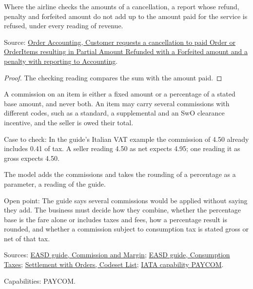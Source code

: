 \begin{theorem}
  \label{thm:accounting-cancel-adds-up}
  Where the airline checks the amounts of a cancellation, a report whose
  refund, penalty and forfeited amount do not add up to the amount paid for
  the service is refused, under every reading of revenue.

  Source: \href{https://standards.atlassian.net/wiki/spaces/OA/pages/844333143}{Order Accounting, Customer requests a cancellation to paid Order or OrderItems resulting in Partial Amount Refunded with a Forfeited amount and a penalty with reporting to Accounting}.
\end{theorem}
\begin{proof}
  The checking reading compares the sum with the amount paid.
\end{proof}

\begin{definition}
  \label{def:accounting-commission-structure}
  A commission on an item is either a fixed amount or a percentage of a
  stated base amount, and never both. An item may carry several commissions
  with different codes, such as a standard, a supplemental and an SwO
  clearance incentive, and the seller is owed their total.

  Case to check: In the guide's Italian VAT example the commission of 4.50
  already includes 0.41 of tax. A seller reading 4.50 as net expects 4.95;
  one reading it as gross expects 4.50.

  The model adds the commissions and takes the rounding of a percentage as
  a parameter, a reading of the guide.

  Open point: The guide says several commissions would be applied without
  saying they add. The business must decide how they combine, whether the
  percentage base is the fare alone or includes taxes and fees, how a
  percentage result is rounded, and whether a commission subject to
  consumption tax is stated gross or net of that tax.

  Sources: \href{https://standards.atlassian.net/wiki/spaces/EASD/pages/574849050}{EASD guide, Commission and Margin};
  \href{https://standards.atlassian.net/wiki/spaces/EASD/pages/2588377182}{EASD guide, Consumption Taxes};
  \href{https://standards.atlassian.net/wiki/spaces/SWO/pages/574456090}{Settlement with Orders, Codeset List};
  \href{https://retailing.iata.org/armi/docs/PAYCOM/}{IATA capability PAYCOM}.

  Capabilities: PAYCOM.
\end{definition}


